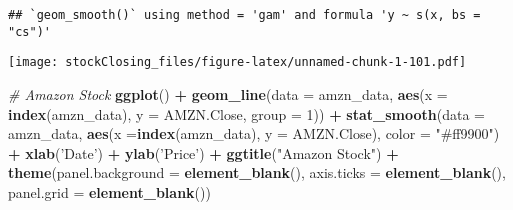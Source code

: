 \documentclass[]{article}
\newenvironment{Shaded}{\begin{snugshade}}{\end{snugshade}}
\newcommand{\CommentTok}[1]{\textcolor[rgb]{0.56,0.35,0.01}{\textit{#1}}}
\newcommand{\DataTypeTok}[1]{\textcolor[rgb]{0.13,0.29,0.53}{#1}}
\newcommand{\DecValTok}[1]{\textcolor[rgb]{0.00,0.00,0.81}{#1}}
\newcommand{\KeywordTok}[1]{\textcolor[rgb]{0.13,0.29,0.53}{\textbf{#1}}}
\newcommand{\NormalTok}[1]{#1}
\newcommand{\OperatorTok}[1]{\textcolor[rgb]{0.81,0.36,0.00}{\textbf{#1}}}
\newcommand{\StringTok}[1]{\textcolor[rgb]{0.31,0.60,0.02}{#1}}
\begin{document}
\begin{Shaded}
\end{Shaded}

\begin{verbatim}
## `geom_smooth()` using method = 'gam' and formula 'y ~ s(x, bs = "cs")'
\end{verbatim}

\texttt{[image: stockClosing\_files/figure-latex/unnamed-chunk-1-101.pdf]}

\begin{Shaded}
\begin{Highlighting}[]
\CommentTok{# Amazon Stock}
\KeywordTok{ggplot}\NormalTok{() }\OperatorTok{+}
\StringTok{  }\KeywordTok{geom_line}\NormalTok{(}\DataTypeTok{data =}\NormalTok{ amzn_data, }\KeywordTok{aes}\NormalTok{(}\DataTypeTok{x =} \KeywordTok{index}\NormalTok{(amzn_data), }\DataTypeTok{y =}\NormalTok{ AMZN.Close, }\DataTypeTok{group =} \DecValTok{1}\NormalTok{)) }\OperatorTok{+}
\StringTok{  }\KeywordTok{stat_smooth}\NormalTok{(}\DataTypeTok{data =}\NormalTok{ amzn_data, }\KeywordTok{aes}\NormalTok{(}\DataTypeTok{x =}\KeywordTok{index}\NormalTok{(amzn_data), }\DataTypeTok{y =}\NormalTok{ AMZN.Close), }\DataTypeTok{color =} \StringTok{"#ff9900"}\NormalTok{) }\OperatorTok{+}
\StringTok{  }\KeywordTok{xlab}\NormalTok{(}\StringTok{'Date'}\NormalTok{) }\OperatorTok{+}
\StringTok{  }\KeywordTok{ylab}\NormalTok{(}\StringTok{'Price'}\NormalTok{) }\OperatorTok{+}
\StringTok{  }\KeywordTok{ggtitle}\NormalTok{(}\StringTok{"Amazon Stock"}\NormalTok{) }\OperatorTok{+}
\StringTok{  }\KeywordTok{theme}\NormalTok{(}\DataTypeTok{panel.background =} \KeywordTok{element_blank}\NormalTok{(),}
        \DataTypeTok{axis.ticks =} \KeywordTok{element_blank}\NormalTok{(),}
        \DataTypeTok{panel.grid =} \KeywordTok{element_blank}\NormalTok{())}
\end{Highlighting}
\end{Shaded}
\end{document}
